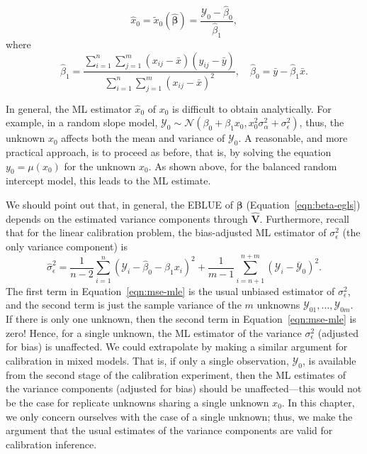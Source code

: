 \documentclass[cmfont,usenames,dvipsnames,leqno]{afit-etd}\usepackage[]{graphicx}\usepackage[]{color}
\newcommand{\mc}[1]{\ensuremath{\mathcal{#1}}}
\newcommand{\wh}[1]{\ensuremath{\widehat{#1}}}
\begin{document}
\begin{equation*}
  \wh{x}_0 = \widetilde{x}_0\left(\wh{\bm{\beta}}\right) = \frac{\mc{Y}_0 - \wh{\beta}_0}{\wh{\beta}_1},
\end{equation*}
where 
\begin{equation*}
  \wh{\beta}_1 = \frac{\sum_{i=1}^n\sum_{j=1}^m\left(x_{ij}-\bar{x}\right)\left(y_{ij}-\bar{y}\right)}{\sum_{i=1}^n\sum_{j=1}^m\left(x_{ij}-\bar{x}\right)^2}, \quad \wh{\beta}_0 = \bar{y} - \wh{\beta}_1\bar{x}.
\end{equation*}

In general, the \ac{ML} estimator $\wh{x}_0$ of $x_0$ is difficult to obtain analytically. For example, in a random slope model, $\mc{Y}_0 \sim \mc{N}\left(\beta_0 + \beta_1 x_0, x_0^2\sigma_\alpha^2 + \sigma_\epsilon^2\right)$, thus, the unknown $x_0$ affects both the mean and variance of $\mc{Y}_0$. A reasonable, and more practical approach, is to proceed as before, that is, by solving the equation $y_0 = \mu(x_0)$ for the unknown $x_0$. As shown above, for the balanced random intercept model, this leads to the \ac{ML} estimate.

We should point out that, in general, the \ac{EBLUE} of $\bm{\beta}$ (Equation~\eqref{eqn:beta-egls}) depends on the estimated variance components through $\wh{\bm{V}}$. Furthermore, recall that for the linear calibration problem, the bias-adjusted \ac{ML} estimator of $\sigma_\epsilon^2$ (the only variance component) is 
\begin{equation}
\label{eqn:mse-mle}
  \wh{\sigma}_\epsilon^2 = \frac{1}{n-2}\sum_{i=1}^n\left(\mc{Y}_i-\wh{\beta}_0-\wh{\beta}_1 x_i\right)^2 + \frac{1}{m-1}\sum_{i=n+1}^{n+m}\left(\mc{Y}_i-\overline{\mc{Y}}_0\right)^2.
\end{equation}
The first term in Equation~\eqref{eqn:mse-mle} is the usual unbiased estimator of $\sigma_\epsilon^2$, and the second term is just the sample variance of the $m$ unknowns $\mc{Y}_{01}, \dotsc, \mc{Y}_{0m}$. If there is only one unknown, then the second term in Equation~\eqref{eqn:mse-mle} is zero! Hence, for a single unknown, the \ac{ML} estimator of the variance $\sigma_\epsilon^2$ (adjusted for bias) is unaffected. We could extrapolate by making a similar argument for calibration in mixed models. That is, if only a single observation, $\mc{Y}_0$, is available from the second stage of the calibration experiment, then the \ac{ML} estimates of the variance components (adjusted for bias) should be unaffected---this would not be the case for replicate unknowns sharing a single unknown $x_0$. In this chapter, we only concern ourselves with the case of a single unknown; thus, we make the argument that the usual estimates of the variance components are valid for calibration inference. 
\end{document}
